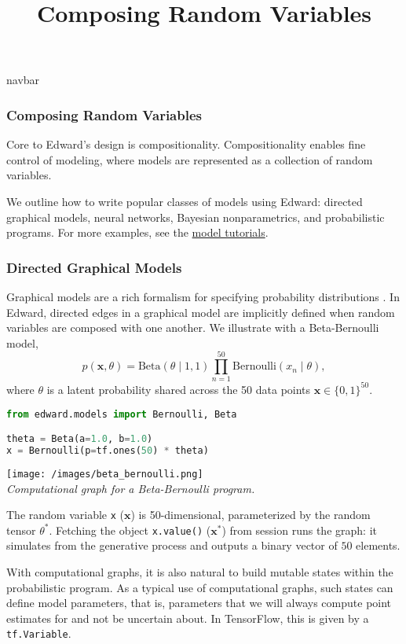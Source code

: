 \title{Composing Random Variables}

{{navbar}}

\subsubsection{Composing Random Variables}

Core to Edward's design is compositionality. Compositionality enables
fine control of modeling, where models are represented as a collection
of random variables.

We outline how to write popular classes of models using Edward:
directed graphical models, neural networks, Bayesian nonparametrics,
and probabilistic programs. For more examples, see the
\href{/tutorials/}{model tutorials}.

\subsubsection{Directed Graphical Models}

Graphical models are a rich formalism for specifying probability
distributions \citep{koller2009probabilistic}.
In Edward, directed edges in a graphical model are implicitly defined
when random variables are composed with one another. We illustrate
with a Beta-Bernoulli model,
\begin{equation*}
p(\mathbf{x}, \theta) =
\text{Beta}(\theta\mid 1, 1)
\prod_{n=1}^{50} \text{Bernoulli}(x_n\mid \theta),
\end{equation*}
where $\theta$ is a latent probability shared across the 50 data
points $\mathbf{x}\in\{0,1\}^{50}$.

\begin{lstlisting}[language=python]
from edward.models import Bernoulli, Beta

theta = Beta(a=1.0, b=1.0)
x = Bernoulli(p=tf.ones(50) * theta)
\end{lstlisting}

\texttt{[image: /images/beta\_bernoulli.png]} \\
{\small\textit{%
Computational graph for a Beta-Bernoulli program.
}}

The random variable \texttt{x} ($\mathbf{x}$) is 50-dimensional,
parameterized by the random tensor $\theta^*$. Fetching the object
\texttt{x.value()} ($\mathbf{x}^*$) from session runs the graph: it simulates from
the generative process and outputs a binary vector of $50$ elements.

With computational graphs, it is also natural to build mutable states
within the probabilistic program. As a typical use of computational
graphs, such states can define model parameters, that is, parameters
that we will always compute point estimates for and not be uncertain
about. In TensorFlow, this is given by a \texttt{tf.Variable}.

